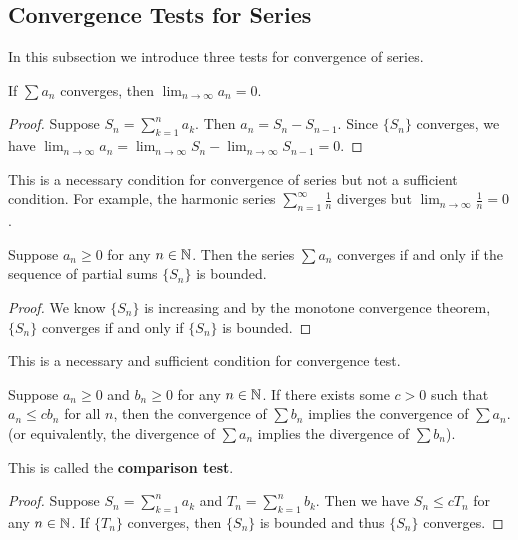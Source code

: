 \documentclass[a4paper]{ctexart}
\begin{document}
    \subsection{Convergence Tests for Series}
    In this subsection we introduce three tests for convergence of series.
    \begin{mythm}
        If $\sum a_n$ converges, then $\displaystyle \lim_{n\to \infty} a_n = 0$.
    \end{mythm}
    \begin{proof}
        Suppose $\displaystyle S_n = \sum_{k=1}^n a_k$. Then $a_n = S_n - S_{n-1}$. Since $\{S_n\}$ converges, we have $\displaystyle \lim_{n\to \infty} a_n = \displaystyle \lim_{n\to \infty} S_n - \displaystyle \lim_{n\to \infty} S_{n-1} = 0$.
    \end{proof}
    \begin{myrmk}
        This is a necessary condition for convergence of series but not a sufficient condition. For example, the harmonic series $\displaystyle \sum_{n=1}^\infty \frac{1}{n}$ diverges but $\displaystyle \lim_{n\to \infty} \frac{1}{n} = 0$.
    \end{myrmk}
    \begin{mythm}
        Suppose $a_n \ge 0$ for any $n\in \mathbb{N}$. Then the series $\sum a_n$ converges if and only if the sequence of partial sums $\{S_n\}$ is bounded.
    \end{mythm}
    \begin{proof}
        We know $\{S_n\} $ is increasing and by the monotone convergence theorem, $\{S_n\}$ converges if and only if $\{S_n\}$ is bounded.
    \end{proof}
    \begin{myrmk}
        This is a necessary and sufficient condition for convergence test.
    \end{myrmk}
    \begin{mythm}
        Suppose $a_n\ge 0$ and $b_n\ge 0$ for any $n\in \mathbb{N}$. If there exists some $c>0$ such that $a_n \le c b_n$ for all $n$, then the convergence of $\sum b_n$ implies the convergence of $\sum a_n$. (or equivalently, the divergence of $\sum a_n$ implies the divergence of $\sum b_n$).
        
        This is called the \textbf{comparison test}.
    \end{mythm}
    \begin{proof}
        Suppose $\displaystyle S_n = \sum_{k=1}^n a_k$ and $\displaystyle T_n = \sum_{k=1}^n b_k$. Then we have $S_n \le c T_n$ for any $n\in \mathbb{N}$. If $\{T_n\}$ converges, then $\{S_n\}$ is bounded and thus $\{S_n\}$ converges.
    \end{proof}
\end{document}
